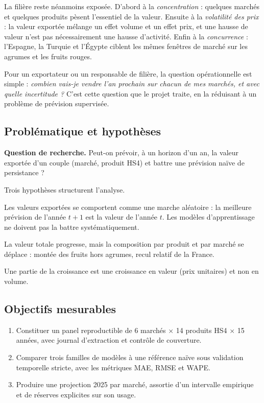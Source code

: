 \documentclass[11pt,a4paper]{article}
\begin{document}
La filière reste néanmoins exposée. D'abord à la \emph{concentration} : quelques
marchés et quelques produits pèsent l'essentiel de la valeur. Ensuite à la
\emph{volatilité des prix} : la valeur exportée mélange un effet volume et un
effet prix, et une hausse de valeur n'est pas nécessairement une hausse
d'activité. Enfin à la \emph{concurrence} : l'Espagne, la Turquie et l'Égypte
ciblent les mêmes fenêtres de marché sur les agrumes et les fruits rouges.

Pour un exportateur ou un responsable de filière, la question opérationnelle est
simple : \emph{combien vais-je vendre l'an prochain sur chacun de mes marchés, et
avec quelle incertitude ?} C'est cette question que le projet traite, en la
réduisant à un problème de prévision supervisée.

\subsection{Problématique et hypothèses}

\textbf{Question de recherche.} Peut-on prévoir, à un horizon d'un an, la valeur
exportée d'un couple (marché, produit HS4) et battre une prévision naïve de
persistance ?

Trois hypothèses structurent l'analyse.

\begin{description}[leftmargin=1.2cm,style=nextline]
\item[H1 --- Persistance.] Les valeurs exportées se comportent comme une marche
aléatoire : la meilleure prévision de l'année $t+1$ est la valeur de l'année $t$.
Les modèles d'apprentissage ne doivent pas la battre systématiquement.
\item[H2 --- Déplacement structurel.] La valeur totale progresse, mais la
composition par produit et par marché se déplace : montée des fruits hors
agrumes, recul relatif de la France.
\item[H3 --- Effet prix.] Une partie de la croissance est une croissance en
valeur (prix unitaires) et non en volume.
\end{description}

\subsection{Objectifs mesurables}

\begin{enumerate}[leftmargin=1.2cm]
\item Constituer un panel reproductible de 6 marchés $\times$ 14 produits HS4
$\times$ 15 années, avec journal d'extraction et contrôle de couverture.
\item Comparer trois familles de modèles à une référence naïve sous validation
temporelle stricte, avec les métriques MAE, RMSE et WAPE.
\item Produire une projection 2025 par marché, assortie d'un intervalle
empirique et de réserves explicites sur son usage.
\end{enumerate}
\end{document}
